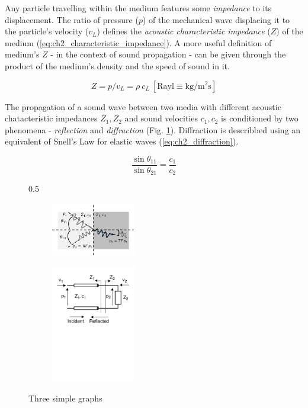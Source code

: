 Any particle travelling within the medium features some \textit{impedance} 
to its displacement. The ratio of pressure ($p$) of the mechanical wave displacing it to the 
particle's velocity ($v_L$) defines the \textit{acoustic characteristic impedance} ($Z$) of 
the medium (\ref{eq:ch2_characteristic_impedance}). 
A more useful definition of medium's $Z$ - in the context of sound propagation - can be 
given through the product of the medium's 
density and the speed of sound in it.

\begin{equation}
  Z = p/v_L = \rho \ c_L \ \mathrm{[Rayl \equiv kg/m^2s]}
  \label{eq:ch2_characteristic_impedance}
\end{equation}

The propagation of a sound wave between two media with different acoustic chatacteristic 
impedances $Z_1,Z_2$ and sound velocities $c_1, c_2$ is conditioned by two phenomena - \emph{reflection} and \emph{diffraction} (Fig. \ref{fig:ch2_reflection_diffraction}). 
Diffraction is describbed using an equivalent of 
Snell's Law for elastic waves (\ref{eq:ch2_diffraction}). 

\begin{equation}
  \frac{\sin{\theta_{11}}}{\sin{\theta_{21}}} = \frac{c_1}{c_2}
  \label{eq:ch2_diffraction}
\end{equation}

\begin{figure}[h]{0.5\textwidth}
  \begin{subfigure}[b]{0.4\textwidth}
      \centering
      \includegraphics[width=0.4\textwidth]{Chapters/Figures/Ch2_UltrasoundFundamentals/reflection_diffraction.pdf}
      \label{fig:ch2_reflection_diffraction}
  \end{subfigure}
  \hfill
  \begin{subfigure}[b]{0.4\textwidth}
      \centering
      \includegraphics[width=0.4\textwidth]{Chapters/Figures/Ch2_UltrasoundFundamentals/impedance_schematic.pdf}
      \label{fig:ch2_dynamic_range}
  \end{subfigure}
     \caption{Three simple graphs}
     \label{fig:ch2_elastic_waves}
\end{figure}

